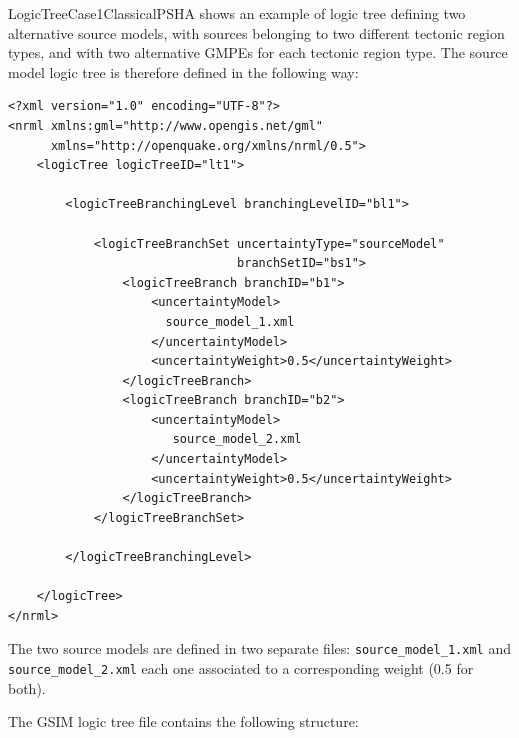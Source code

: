 LogicTreeCase1ClassicalPSHA shows an example of logic tree defining two
alternative source models, with sources belonging to two different tectonic
region types, and with two alternative GMPEs for each tectonic  region type.
The source model logic tree is therefore defined in the following way:

\begin{Verbatim}[frame=single, commandchars=\\\{\}, fontsize=\normalsize]
<?xml version="1.0" encoding="UTF-8"?>
<nrml xmlns:gml="http://www.opengis.net/gml"
      xmlns="http://openquake.org/xmlns/nrml/0.5">
    <logicTree logicTreeID="lt1">

        <logicTreeBranchingLevel branchingLevelID="bl1">

            <logicTreeBranchSet uncertaintyType="sourceModel"
                                branchSetID="bs1">
                <logicTreeBranch branchID="b1">
                    <uncertaintyModel>
                      source_model_1.xml
                    </uncertaintyModel>
                    <uncertaintyWeight>0.5</uncertaintyWeight>
                </logicTreeBranch>
                <logicTreeBranch branchID="b2">
                    <uncertaintyModel>
                       source_model_2.xml
                    </uncertaintyModel>
                    <uncertaintyWeight>0.5</uncertaintyWeight>
                </logicTreeBranch>
            </logicTreeBranchSet>

        </logicTreeBranchingLevel>

    </logicTree>
</nrml>
\end{Verbatim}

The two source models are defined in two separate files:
\texttt{source\_\-model\_\-1.xml} and \texttt{source\_\-model\_\-2.xml} each
one associated to a corresponding weight (0.5 for both).

The GSIM logic tree file contains the following structure:


